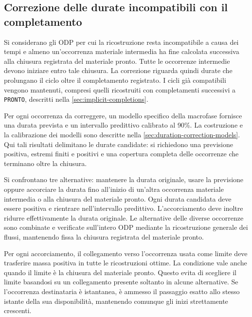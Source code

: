 \subsection{Correzione delle durate incompatibili con il completamento}
\label{sec:temporal-duration-corrections}

Si considerano gli ODP per cui la ricostruzione resta incompatibile a causa dei tempi e almeno un'occorrenza materiale intermedia ha fine calcolata successiva alla chiusura registrata del materiale pronto. Tutte le occorrenze intermedie devono iniziare entro tale chiusura. La correzione riguarda quindi durate che prolungano il ciclo oltre il completamento registrato. I cicli già compatibili vengono mantenuti, compresi quelli ricostruiti con completamenti successivi a \texttt{PRONTO}, descritti nella \cref{sec:implicit-completions}.

Per ogni occorrenza da correggere, un modello specifico della macrofase fornisce una durata prevista e un intervallo predittivo calibrato al 90\%. La costruzione e la calibrazione dei modelli sono descritte nella \cref{sec:duration-correction-models}. Qui tali risultati delimitano le durate candidate: si richiedono una previsione positiva, estremi finiti e positivi e una copertura completa delle occorrenze che terminano oltre la chiusura.

Si confrontano tre alternative: mantenere la durata originale, usare la previsione oppure accorciare la durata fino all'inizio di un'altra occorrenza materiale intermedia o alla chiusura del materiale pronto. Ogni durata candidata deve essere positiva e rientrare nell'intervallo predittivo. L'accorciamento deve inoltre ridurre effettivamente la durata originale. Le alternative delle diverse occorrenze sono combinate e verificate sull'intero ODP mediante la ricostruzione generale dei flussi, mantenendo fissa la chiusura registrata del materiale pronto.

Per ogni accorciamento, il collegamento verso l'occorrenza usata come limite deve trasferire massa positiva in tutte le ricostruzioni ottime. La condizione vale anche quando il limite è la chiusura del materiale pronto. Questo evita di scegliere il limite basandosi su un collegamento presente soltanto in alcune alternative. Se l'occorrenza destinataria è istantanea, è ammesso il passaggio esatto allo stesso istante della sua disponibilità, mantenendo comunque gli inizi strettamente crescenti.

